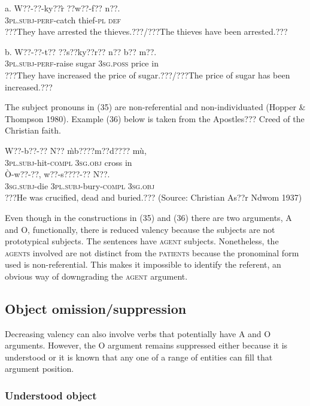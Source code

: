 \documentclass[output=paper]{langsci/langscibook}
\begin{document}
\ea
\gll a.  W??-??-ky??\`{r}    ??w??-f??    n??.\\
       \textsc{3pl.subj}{}-\textsc{perf}{}-catch  thief-\textsc{pl}  \textsc{def}\\
\glt ???They have arrested the thieves.???/???The thieves have been arrested.???
\z

\ea
\gll  b.  W??-??-t??    ??s??ky??r??  n??    b??  m??.\\
       \textsc{3pl.subj}{}-\textsc{perf}{}-raise  sugar    \textsc{3sg.poss}  price  in\\
\glt   ???They have increased the price of sugar.???/???The price of sugar has been increased.???
\z

The subject pronouns in (35) are non-referential and non-individuated (Hopper \& Thompson 1980). Example (36) below is taken from the Apostles??? Creed of the Christian faith. 

\ea
\gll W??-b??-??       N??    \`{m}b????m??d????  m\`{u}, \\
     \textsc{3pl.subj}{}-hit\textsc{{}-compl}  \textsc{3sg.obj}  cross    in\\
\gll \`{O}-w??-??,     w??-s????-??     N??.\\
     \textsc{3sg.subj}{}-die  \textsc{3pl.subj}{}-bury\textsc{{}-compl}  \textsc{3sg.obj}\\
\glt ???He was crucified, dead and buried.??? (Source: Christian As??r Ndwom 1937)
\z

Even though in the constructions in (35) and (36) there are two arguments, A and O, functionally, there is reduced valency because the subjects are not prototypical subjects. The sentences have \textsc{agent} subjects. Nonetheless, the \textsc{agents} involved are not distinct from the \textsc{patients} because the pronominal form used is non-referential. This makes it impossible to identify the referent, an obvious way of downgrading the \textsc{agent} argument.

\subsection{Object omission/suppression }

Decreasing valency can also involve verbs that potentially have A and O arguments. However, the O argument remains suppressed either because it is understood or it is known that any one of a range of entities can fill that argument position.

\subsubsection{Understood object}
\end{document}
